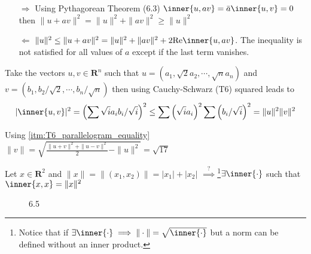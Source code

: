 \begin{figure}[h!]
\centering
{}
\end{figure}

\begin{itemize}
\item[$\Rightarrow$] Using Pythagorean Theorem (6.3) $\inner{u,av}=\bar{a}\inner{u,v}=0$ then $\|u+av\|^2 = \|u\|^2+\|av\|^2 \geq \|u\|^2$
\item[$\Leftarrow$]$\|u\|^2 \leq \|u+av\|^2 = \|u\|^2+\|av\|^2 +2\mathrm{Re}\inner{u,av}$. The inequality is not satisfied for all values of $a$ except if the last term vanishes. 
\end{itemize}
\exo{} Take the vectors $u,v\in\mathbf{R}^n$ such that $u=(a_1, \sqrt{2}a_2, \cdots, \sqrt{n}a_n)$ and  $v=(b_1,b_2/\sqrt{2}, \cdots, b_n/\sqrt{n})$ then using Cauchy-Schwarz (T6) squared leads to
\begin{align*}
|\inner{u,v}|^2 = \left(\sum \sqrt{i}a_ib_i/\sqrt{i}\right)^2 \leq\sum \left(\sqrt{i}a_i\right)^2 \sum\left(b_i/\sqrt{i}\right)^2 = \|u\|^2  \|v\|^2
\end{align*}

\exo{} Using \eqref{itm:T6_parallelogram_equality} $\|v\|=\sqrt{\frac{\|u+v\|^2 +\|u-v\|^2}{2} - \|u\|^2} =\sqrt{17}$

\exo{} Let $x\in\mathbf{R}^2$ and $\|x\| = \|(x_1,x_2)\| = |x_1| + |x_2|$ $\stackrel{?}{\implies}$\footnote{Notice that if $\exists \inner{\cdot} \implies \|\cdot\| = \sqrt{\inner{\cdot}}$ but a norm can be defined without an inner product.}$\exists \inner{\cdot}$ such that $\inner{x,x} = \|x\|^2$

\begin{figure}[h!]
\centering
{}
\caption{6.5}
\end{figure}

